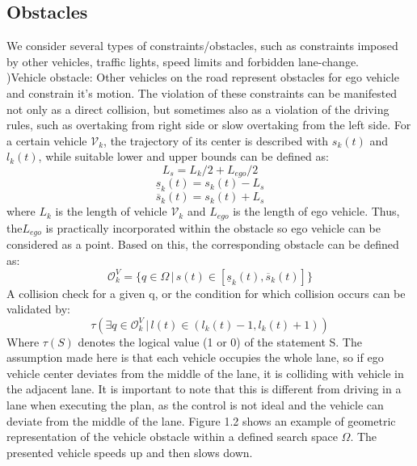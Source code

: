 \documentclass{thesisreport}
\begin{document}
 \subsection{Obstacles}
 We consider several types of constraints/obstacles, such as constraints imposed by other vehicles, traffic lights, speed limits and forbidden lane-change.\\
 )Vehicle obstacle: Other vehicles on the road represent obstacles for ego vehicle and constrain it’s motion. The violation of these constraints can be manifested not only as a direct collision, but sometimes also as a violation of the driving rules, such as overtaking from right side or slow overtaking from the left side. For a certain vehicle $\mathcal V_k$, the trajectory of its center is described with $s_k(t)$ and $l_k(t)$, while suitable lower and upper bounds can be defined as:
 \begin{equation}
 L_s = L_k / 2 + L_{ego} / 2 
 \end{equation}
 \begin{equation}
 \underline{s}_k(t) = s_k(t) - L_s
 \end{equation}
  \begin{equation}
 \overline{s}_k(t) = s_k(t) + L_s
 \end{equation}
 where $L_k$ is the length of vehicle $\mathcal V_k$ and $L_{ego}$ is the length of ego vehicle. Thus, the$L_{ego}$ is practically incorporated within the obstacle so ego vehicle can be considered as a point. Based on this, the corresponding obstacle can be defined as:
 \begin{equation}
 	\mathcal O_k^V = \{q \in \Omega \, | \, s(t) \in [\underline{s}_k(t),\overline{s}_k(t)]\}
 \end{equation}
 A collision check for a given q, or the condition for which collision occurs can be validated by:
 \begin{equation}
 	\tau (\exists q\in \mathcal O_k^V \, | \,l(t) \in (l_k(t)-1, l_k(t)+1) )
 \end{equation}
 Where $\tau(S)$ denotes the logical value (1 or 0) of the statement S. The assumption made here is that each vehicle
 occupies the whole lane, so if ego vehicle center deviates from the middle of the lane, it is colliding with vehicle in the adjacent lane. It is important to note that this is different from driving in a lane when executing the plan, as the control is not ideal and the vehicle can deviate from the middle of the lane. Figure 1.2 shows an example of geometric representation of the vehicle obstacle within a defined search space $\Omega$. The presented vehicle speeds up and then slows down.
\end{document}
